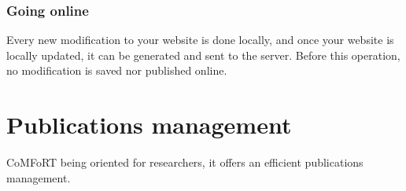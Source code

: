 \documentclass{article}
\begin{document}
\subsubsection{Going online}
Every new modification to your website is done locally, and once your website is locally updated, it can be generated and sent to the server. Before this operation, no modification is saved nor published online. 

\section{Publications management}

CoMFoRT being oriented for researchers, it offers an efficient publications management. 

\end{document}
